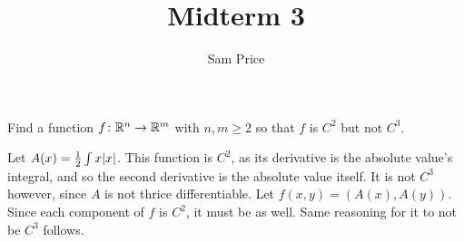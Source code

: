 \documentclass{article}
\author{Sam Price}
\title{Midterm 3}
\begin{document}
\maketitle

Find a function $f \from \RR[n] \to \RR[m]$ with $n, m \ge 2$ so that $f$ is $C^{2}$ but not $C^{3}$.

Let $A(x) = \frac{1}{2}\int x\abs{x}$. This function is $C^{2}$, as its derivative is the absolute value's integral, and so the second derivative is the absolute value itself.
It is not $C^{3}$ however, since $A$ is not thrice differentiable. Let $f(x, y) = (A(x), A(y))$. Since each component of $f$ is $C^{2}$, it must be as well.
Same reasoning for it to not be $C^{3}$ follows.
\end{document}
